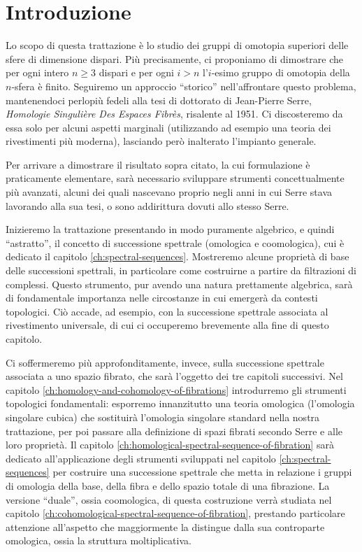 \chapter*{Introduzione}
Lo scopo di questa trattazione è lo studio dei gruppi di omotopia superiori delle sfere di dimensione dispari. Più precisamente, ci proponiamo di dimostrare che per ogni intero $n\ge 3$ dispari e per ogni $i>n$ l'$i$-esimo gruppo di omotopia della $n$-sfera è finito. Seguiremo un approccio \enquote{storico} nell'affrontare questo problema, mantenendoci perlopiù fedeli alla tesi di dottorato di Jean-Pierre Serre, \emph{Homologie Singulière Des Espaces Fibrès}, risalente al 1951. Ci discosteremo da essa solo per alcuni aspetti marginali (utilizzando ad esempio una teoria dei rivestimenti più moderna), lasciando però inalterato l'impianto generale.

Per arrivare a dimostrare il risultato sopra citato, la cui formulazione è praticamente elementare, sarà necessario sviluppare strumenti concettualmente più avanzati, alcuni dei quali nascevano proprio negli anni in cui Serre stava lavorando alla sua tesi, o sono addirittura dovuti allo stesso Serre.

Inizieremo la trattazione presentando in modo puramente algebrico, e quindi \enquote{astratto}, il concetto di successione spettrale (omologica e coomologica), cui è dedicato il capitolo \ref{ch:spectral-sequences}. Mostreremo alcune proprietà di base delle successioni spettrali, in particolare come costruirne a partire da filtrazioni di complessi. Questo strumento, pur avendo una natura prettamente algebrica, sarà di fondamentale importanza nelle circostanze in cui emergerà da contesti topologici. Ciò accade, ad esempio, con la successione spettrale associata al rivestimento universale, di cui ci occuperemo brevemente alla fine di questo capitolo.

Ci soffermeremo più approfonditamente, invece, sulla successione spettrale associata a uno spazio fibrato, che sarà l'oggetto dei tre capitoli successivi. Nel capitolo \ref{ch:homology-and-cohomology-of-fibrations} introdurremo gli strumenti topologici fondamentali: esporremo innanzitutto una teoria omologica (l'omologia singolare cubica) che sostituirà l'omologia singolare standard nella nostra trattazione, per poi passare alla definizione di spazi fibrati secondo Serre e alle loro proprietà. Il capitolo \ref{ch:homological-spectral-sequence-of-fibration} sarà dedicato all'applicazione degli strumenti sviluppati nel capitolo \ref{ch:spectral-sequences} per costruire una successione spettrale che metta in relazione i gruppi di omologia della base, della fibra e dello spazio totale di una fibrazione. La versione \enquote{duale}, ossia coomologica, di questa costruzione verrà studiata nel capitolo \ref{ch:cohomological-spectral-sequence-of-fibration}, prestando particolare attenzione all'aspetto che maggiormente la distingue dalla sua controparte omologica, ossia la struttura moltiplicativa.

